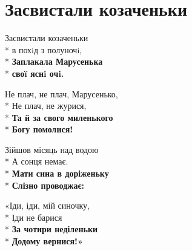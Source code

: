 \vspace{\fill}\newpage

\section{Засвистали козаченьки}
\label{song:Засвистали_козаченьки}

\medskip

\begin{minipage}{\linewidth}
Засвистали козаченьки\\*
в похiд з полуночi,\\*
\textbf{Заплакала Марусенька}\\*
\textbf{своï яснi очi.}\\
\end{minipage}\par\medskip\nobreak

\medskip

\begin{minipage}{\linewidth}
Не плач, не плач, Марусенько,\\*
Не плач, не журися,\\*
\textbf{Та й за свого миленького}\\*
\textbf{Богу помолися!}\\
\end{minipage}\par\medskip\nobreak

\medskip

\begin{minipage}{\linewidth}
Зійшов місяць над водою\\*
А сонця немає.\\*
\textbf{Мати сина в доріженьку}\\*
\textbf{Слізно проводжає:}\\
\end{minipage}\par\medskip\nobreak

\medskip

\begin{minipage}{\linewidth}
«Іди, іди, мій синочку,\\*
Іди не барися\\*
\textbf{За чотири неділеньки}\\*
\textbf{Додому вернися!»}\\
\end{minipage}\par\medskip\nobreak

\medskip

